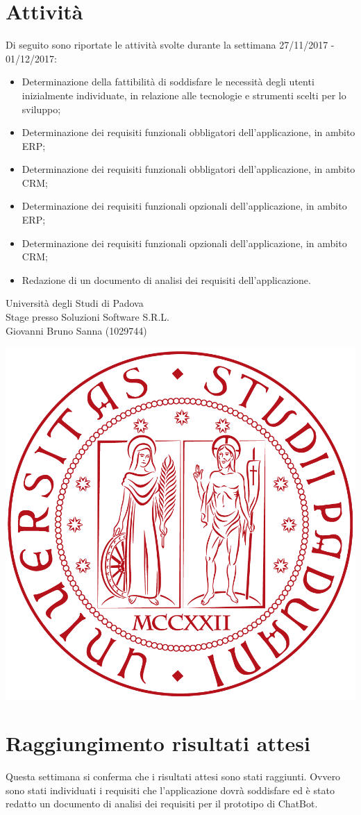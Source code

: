 \documentclass[11pt,notitlepage]{article}
\newcommand{\nomeStudente}{Giovanni Bruno}
\newcommand{\cognomeStudente}{Sanna}
\newcommand{\matricolaStudente}{1029744}
\newcommand{\ragioneSocAzienda}{Soluzioni Software S.R.L.}
\begin{document}
\bigskip
\section*{Attività}
Di seguito sono riportate le attività svolte durante la settimana 27/11/2017 - 01/12/2017:
\begin{itemize}
		\item Determinazione della fattibilità di soddisfare le necessità degli utenti inizialmente individuate, in relazione alle tecnologie e strumenti scelti per lo sviluppo;
		\item Determinazione dei requisiti funzionali obbligatori dell'applicazione, in ambito ERP;
		\item Determinazione dei requisiti funzionali obbligatori dell'applicazione, in ambito CRM;
		\item Determinazione dei requisiti funzionali opzionali dell'applicazione, in ambito ERP;
		\item Determinazione dei requisiti funzionali opzionali dell'applicazione, in ambito CRM;
		\item Redazione di un documento di analisi dei requisiti dell'applicazione.
\end{itemize}


\newpage
\noindent
\parbox{0.7\columnwidth}{Università degli Studi di Padova\\
	Stage presso \ragioneSocAzienda{}\\
	\nomeStudente{} \cognomeStudente{} (\matricolaStudente{})}%
\parbox{0.3\columnwidth}{
	\hfill \includegraphics[scale=0.08]{immagini/logo-unipd.png}}

\bigskip
\section*{Raggiungimento risultati attesi}
Questa settimana si conferma che i risultati attesi sono stati raggiunti. Ovvero sono stati individuati i requisiti che l'applicazione dovrà soddisfare ed è stato redatto un documento di analisi dei requisiti per il prototipo di ChatBot.
\end{document}
